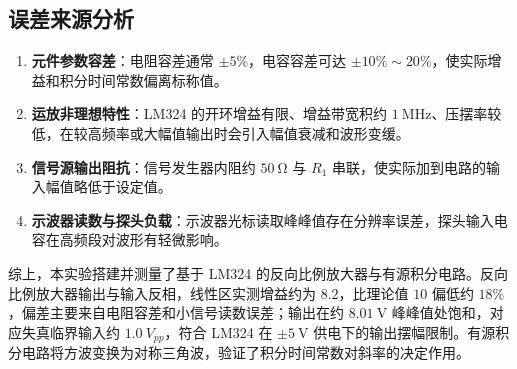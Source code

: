 \subsection{误差来源分析}

\begin{enumerate}[label=\arabic*.]
    \item \textbf{元件参数容差}：电阻容差通常 \(\pm5\%\)，电容容差可达 \(\pm10\%\sim20\%\)，使实际增益和积分时间常数偏离标称值。
    \item \textbf{运放非理想特性}：LM324 的开环增益有限、增益带宽积约 \(\SI{1}{\mega\hertz}\)、压摆率较低，在较高频率或大幅值输出时会引入幅值衰减和波形变缓。
    \item \textbf{信号源输出阻抗}：信号发生器内阻约 \(\SI{50}{\ohm}\) 与 \(R_1\) 串联，使实际加到电路的输入幅值略低于设定值。
    \item \textbf{示波器读数与探头负载}：示波器光标读取峰峰值存在分辨率误差，探头输入电容在高频段对波形有轻微影响。
\end{enumerate}

综上，本实验搭建并测量了基于 LM324 的反向比例放大器与有源积分电路。反向比例放大器输出与输入反相，线性区实测增益约为 \(8.2\)，比理论值 \(10\) 偏低约 \(18\%\)，偏差主要来自电阻容差和小信号读数误差；输出在约 \(\SI{8.01}{\volt}\) 峰峰值处饱和，对应失真临界输入约 \(\SI{1.0}{V_{pp}}\)，符合 LM324 在 \(\pm\SI{5}{\volt}\) 供电下的输出摆幅限制。有源积分电路将方波变换为对称三角波，验证了积分时间常数对斜率的决定作用。

